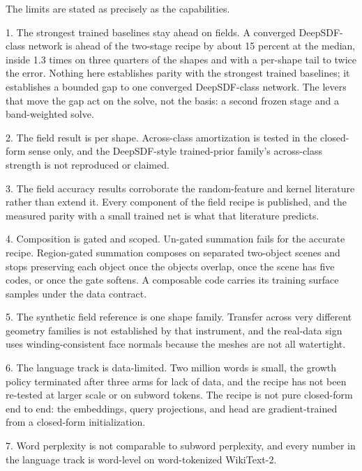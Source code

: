 \documentclass[11pt]{article}
\begin{document}
The limits are stated as precisely as the capabilities.

1. The strongest trained baselines stay ahead on fields. A converged
   DeepSDF-class network is ahead of the two-stage recipe by about
   15 percent at the median, inside 1.3 times on three quarters of
   the shapes and with a per-shape tail to twice the error. Nothing
   here establishes parity with the strongest trained baselines;
   it establishes a bounded gap to one converged DeepSDF-class
   network. The levers that move the gap act on the solve, not the
   basis: a second frozen stage and a band-weighted solve.

2. The field result is per shape. Across-class amortization is
   tested in the closed-form sense only, and the DeepSDF-style
   trained-prior family's across-class strength is not reproduced
   or claimed.

3. The field accuracy results corroborate the random-feature and
   kernel literature rather than extend it. Every component of the
   field recipe is published, and the measured parity with a small
   trained net is what that literature predicts.

4. Composition is gated and scoped. Un-gated summation fails for
   the accurate recipe. Region-gated summation composes on
   separated two-object scenes and stops preserving each object
   once the objects overlap, once the scene has five codes, or once
   the gate softens. A composable code carries its training surface
   samples under the data contract.

5. The synthetic field reference is one shape family. Transfer
   across very different geometry families is not established by
   that instrument, and the real-data sign uses winding-consistent
   face normals because the meshes are not all watertight.

6. The language track is data-limited. Two million words is small,
   the growth policy terminated after three arms for lack of data,
   and the recipe has not been re-tested at larger scale or on
   subword tokens. The recipe is not pure closed-form end to end:
   the embeddings, query projections, and head are gradient-trained
   from a closed-form initialization.

7. Word perplexity is not comparable to subword perplexity, and
   every number in the language track is word-level on
   word-tokenized WikiText-2.
\end{document}
